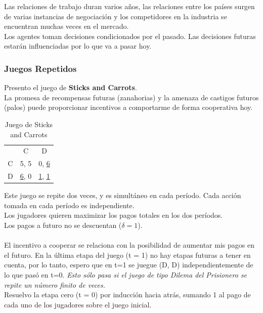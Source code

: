 \documentclass{article}
\newcommand{\ulcolor}[2][Red]{\setulcolor{#1}\ul{#2}}
\begin{document}
                Las relaciones de trabajo duran varios años, las relaciones entre los países surgen de varias instancias de negociación y los competidores en la industria se encuentran muchas veces en el mercado. \\
                Los agentes toman decisiones condicionados por el pasado. Las decisiones futuras estarán influenciadas por lo que va a pasar hoy.
            \subsubsection*{Juegos Repetidos}
                Presento el juego de \textbf{Sticks and Carrots}. \\
                La promesa de recompensas futuras (zanahorias) y la amenaza de castigos futuros (palos) puede proporcionar incentivos a comportarme de forma cooperativa hoy.
                \begin{table}[H]
                    \centering
                        \begin{tabular}{|c|c|c|}
                                & C     & D     \\
                            C   & 5, 5  & 0, \ulcolor[blue]{6}  \\
                            D   & \ulcolor[Red]{6}, 0  & \ulcolor[Red]{1}, \ulcolor[blue]{1}  \\
                        \end{tabular}
                    \caption{Juego de Sticks and Carrots}
                \end{table}
                Este juego se repite dos veces, y es simultáneo en cada período. Cada acción tomada en cada período es independiente. \\
                Los jugadores quieren maximizar los pagos totales en los dos períodos. \\
                Los pagos a futuro no se descuentan ($\delta = 1$). \\
                \\
                El incentivo a cooperar se relaciona con la posibilidad de aumentar mis pagos en el futuro. En la última etapa del juego (t = 1) no hay etapas futuras a tener en cuenta, por lo tanto, espero que en t=1 se juegue (D, D) independientemente de lo que pasó en t=0. \emph{Esto sólo pasa si el juego de tipo Dilema del Prisionero se repite un número finito de veces.} \\
                Resuelvo la etapa cero (t = 0) por inducción hacia atrás, sumando 1 al pago de cada uno de los jugadores sobre el juego inicial.
\end{document}
